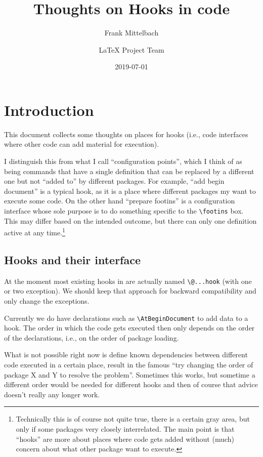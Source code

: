 \documentclass{article}
\title{Thoughts on Hooks in code}
\author{Frank Mittelbach \and
  \LaTeX{} Project Team}
\date{2019-07-01}
\newcounter{hook}
\newcounter{config}
\newcommand\cs[1]{\texttt{\textbackslash #1}}
\begin{document}
\maketitle

\tableofcontents

\section{Introduction}


This document collects some thoughts on places for hooks (i.e., code
interfaces where other code can add material for execution).

I distinguish this from what I call  ``configuration points'', which I think of as
being commands that have a single definition that can be replaced by a
different one but not ``added to'' by different packages. For example,
``add begin document'' is a typical hook, as it is a place where
different packages my want to execute some code. On the other hand
``prepare footins'' is a configuration interface whose sole purpose is
to do something specific to the \cs{footins} box. This may differ
based on the intended outcome, but there can only one definition active at any
time.\footnote{Technically this is of course not quite true, there is
  a certain gray area, but only if some packages very closely
  interrelated. The main point is that ``hooks'' are more about places
  where code gets added without (much) concern about what other
  package want to execute.}


\subsection{Hooks and their interface}

At the moment most existing hooks in \LaTeXe{} are actually named
\cs{@...hook} (with one or two exception). We should keep that
approach for backward compatibility and only change the exceptions.

Currently we do have declarations such as \cs{AtBeginDocument} to add
data to a hook.  The order in which the code gets executed then only
depends on the order of the declarations, i.e., on the order of
package loading.

What is not possible right now is define known dependencies between
different code executed in a certain place, result in the famous ``try
changing the order of package X and Y to resolve the
problem''. Sometimes this works, but sometime a different order would
be needed for different hooks and then of course that advice doesn't
really any longer work.
\end{document}
